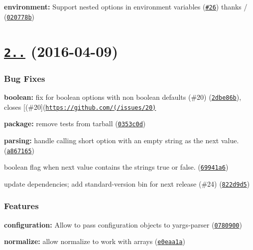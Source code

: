 \begin{DoxyItemize}
\item {\bfseries environment\+:} Support nested options in environment variables (\href{https://github.com/yargs/yargs-parser/issues/26}{\tt \#26}) thanks \href{https://github.com/elas7}{\tt } / (\href{https://github.com/yargs/yargs-parser/commit/020778b}{\tt 020778b})
\end{DoxyItemize}

\label{_2.3.0}%
 \section*{\href{https://github.com/yargs/yargs-parser/compare/v2.2.0...v2.3.0}{\tt 2..} (2016-\/04-\/09)}

\subsubsection*{Bug Fixes}


\begin{DoxyItemize}
\item {\bfseries boolean\+:} fix for boolean options with non boolean defaults (\#20) (\href{https://github.com/yargs/yargs-parser/commit/2dbe86b}{\tt 2dbe86b}), closes \mbox{[}(\#20\mbox{]}(\href{https://github.com/(/issues/20)}{\tt https\+://github.\+com/(/issues/20)}
\item {\bfseries package\+:} remove tests from tarball (\href{https://github.com/yargs/yargs-parser/commit/0353c0d}{\tt 0353c0d})
\item {\bfseries parsing\+:} handle calling short option with an empty string as the next value. (\href{https://github.com/yargs/yargs-parser/commit/a867165}{\tt a867165})
\item boolean flag when next value contains the strings \textquotesingle{}true\textquotesingle{} or \textquotesingle{}false\textquotesingle{}. (\href{https://github.com/yargs/yargs-parser/commit/69941a6}{\tt 69941a6})
\item update dependencies; add standard-\/version bin for next release (\#24) (\href{https://github.com/yargs/yargs-parser/commit/822d9d5}{\tt 822d9d5})
\end{DoxyItemize}

\subsubsection*{Features}


\begin{DoxyItemize}
\item {\bfseries configuration\+:} Allow to pass configuration objects to yargs-\/parser (\href{https://github.com/yargs/yargs-parser/commit/0780900}{\tt 0780900})
\item {\bfseries normalize\+:} allow normalize to work with arrays (\href{https://github.com/yargs/yargs-parser/commit/e0eaa1a}{\tt e0eaa1a}) 
\end{DoxyItemize}